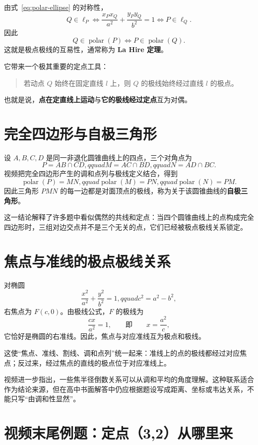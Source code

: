 \documentclass[UTF8,11pt]{ctexart}
\newcommand{\polar}{\operatorname{polar}}
\begin{document}
由式~\eqref{eq:polar-ellipse} 的对称性，
\[
Q\in\ell_P
\iff
\frac{x_Px_Q}{a^2}+\frac{y_Py_Q}{b^2}=1
\iff
P\in\ell_Q.
\]
因此
\begin{equation}
\label{eq:lahire}
\boxed{Q\in\polar(P)\iff P\in\polar(Q)}.
\end{equation}
这就是极点极线的互易性，通常称为 \textbf{La Hire 定理}。

它带来一个极其重要的定点工具：
\begin{quote}
若动点 $Q$ 始终在固定直线 $l$ 上，则 $Q$ 的极线始终经过直线 $l$ 的极点。
\end{quote}
也就是说，\textbf{点在定直线上运动}与\textbf{它的极线经过定点}互为对偶。

\section{完全四边形与自极三角形}
\label{sec:self-polar}

设 $A,B,C,D$ 是同一非退化圆锥曲线上的四点，三个对角点为
\[
P=AB\cap CD,qquad
M=AC\cap BD,qquad
N=AD\cap BC.
\]
视频把完全四边形产生的调和点列与极线定义结合，得到
\begin{equation}
\label{eq:self-polar}
\boxed{
\polar(P)=MN,qquad
\polar(M)=PN,qquad
\polar(N)=PM
}.
\end{equation}
因此三角形 $PMN$ 的每一边都是对面顶点的极线，称为关于该圆锥曲线的\textbf{自极三角形}。

这一结论解释了许多题中看似偶然的共线和定点：当四个圆锥曲线上的点构成完全四边形时，三组对边交点并不是三个无关的点，它们已经被极点极线关系锁定。

\section{焦点与准线的极点极线关系}

对椭圆
\[
\frac{x^2}{a^2}+\frac{y^2}{b^2}=1,qquad c^2=a^2-b^2,
\]
右焦点为 $F(c,0)$。由极线公式，$F$ 的极线为
\[
\frac{cx}{a^2}=1,
\qquad\text{即}\qquad
\boxed{x=\frac{a^2}{c}},
\]
它恰好是椭圆的右准线。因此，焦点与对应准线互为极点和极线。

这使“焦点、准线、割线、调和点列”统一起来：准线上的点的极线都经过对应焦点；反过来，经过焦点的直线的极点位于对应准线上。

视频进一步指出，一些焦半径倒数关系可以从调和平均的角度理解。这种联系适合作为结论来源，但在高中书面解答中仍应根据题设写成距离、坐标或韦达关系，不能只写“由调和性显然”。

\section{视频末尾例题：定点（3,2）从哪里来}
\end{document}
